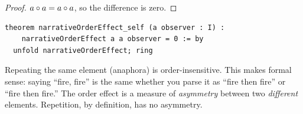 \begin{proof}
$a \circ a = a \circ a$, so the difference is zero.
\end{proof}

\begin{lstlisting}
theorem narrativeOrderEffect_self (a observer : I) :
    narrativeOrderEffect a a observer = 0 := by
  unfold narrativeOrderEffect; ring
\end{lstlisting}

\begin{interpretation}
Repeating the same element (anaphora) is order-insensitive.  This makes
formal sense: saying ``fire, fire'' is the same whether you parse it as
``fire then fire'' or ``fire then fire.''  The order effect is a measure
of \emph{asymmetry} between two \emph{different} elements.  Repetition,
by definition, has no asymmetry.
\end{interpretation}
